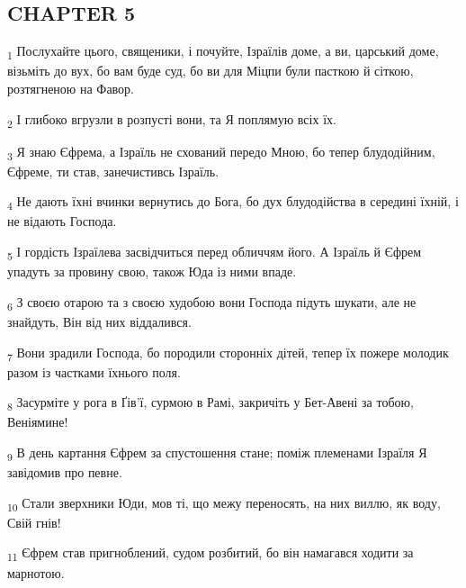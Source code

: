 \subsection{CHAPTER 5}
\begin{tcolorbox}
\textsubscript{1} Послухайте цього, священики, і почуйте, Ізраїлів доме, а ви, царський доме, візьміть до вух, бо вам буде суд, бо ви для Міцпи були пасткою й сіткою, розтягненою на Фавор.
\end{tcolorbox}
\begin{tcolorbox}
\textsubscript{2} І глибоко вгрузли в розпусті вони, та Я поплямую всіх їх.
\end{tcolorbox}
\begin{tcolorbox}
\textsubscript{3} Я знаю Єфрема, а Ізраїль не схований передо Мною, бо тепер блудодійним, Єфреме, ти став, занечистивсь Ізраїль.
\end{tcolorbox}
\begin{tcolorbox}
\textsubscript{4} Не дають їхні вчинки вернутись до Бога, бо дух блудодійства в середині їхній, і не відають Господа.
\end{tcolorbox}
\begin{tcolorbox}
\textsubscript{5} І гордість Ізраїлева засвідчиться перед обличчям його. А Ізраїль й Єфрем упадуть за провину свою, також Юда із ними впаде.
\end{tcolorbox}
\begin{tcolorbox}
\textsubscript{6} З своєю отарою та з своєю худобою вони Господа підуть шукати, але не знайдуть, Він від них віддалився.
\end{tcolorbox}
\begin{tcolorbox}
\textsubscript{7} Вони зрадили Господа, бо породили сторонніх дітей, тепер їх пожере молодик разом із частками їхнього поля.
\end{tcolorbox}
\begin{tcolorbox}
\textsubscript{8} Засурміте у рога в Ґів'ї, сурмою в Рамі, закричіть у Бет-Авені за тобою, Веніямине!
\end{tcolorbox}
\begin{tcolorbox}
\textsubscript{9} В день картання Єфрем за спустошення стане; поміж племенами Ізраїля Я завідомив про певне.
\end{tcolorbox}
\begin{tcolorbox}
\textsubscript{10} Стали зверхники Юди, мов ті, що межу переносять, на них виллю, як воду, Свій гнів!
\end{tcolorbox}
\begin{tcolorbox}
\textsubscript{11} Єфрем став пригноблений, судом розбитий, бо він намагався ходити за марнотою.
\end{tcolorbox}
